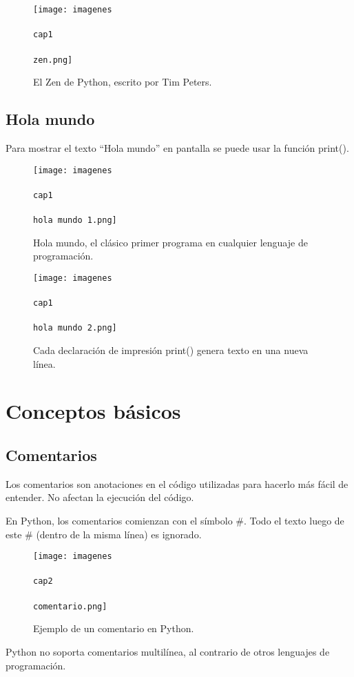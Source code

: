 \documentclass{article}
\newcommand{\doble}[1]{``#1''}
\begin{document}
      \begin{figure}[ht!]
        \texttt{[image: imagenes\\\\cap1\\\\zen.png]}
        \caption{El Zen de Python, escrito por Tim Peters.}
      \end{figure}


    \subsection{Hola mundo}

      Para mostrar el texto \doble{Hola mundo} en pantalla se puede usar la función print().

      \begin{figure}[ht!]
        \texttt{[image: imagenes\\\\cap1\\\\hola mundo 1.png]}
        \caption{Hola mundo, el clásico primer programa en cualquier lenguaje de programación.}
      \end{figure}

      \begin{figure}[ht!]
        \texttt{[image: imagenes\\\\cap1\\\\hola mundo 2.png]}
        \caption{Cada declaración de impresión print() genera texto en una nueva línea.}
      \end{figure}

  \newpage
  \section{Conceptos básicos}

    \subsection{Comentarios}

      Los comentarios son anotaciones en el código utilizadas para hacerlo más fácil de entender. No afectan la ejecución del código.

      En Python, los comentarios comienzan con el símbolo \#. Todo el texto luego de este \# (dentro de la misma línea) es ignorado.

      \begin{figure}[ht!]
        \texttt{[image: imagenes\\\\cap2\\\\comentario.png]}
        \caption{Ejemplo de un comentario en Python.}
      \end{figure}

      Python no soporta comentarios multilínea, al contrario de otros lenguajes de programación.
\end{document}
